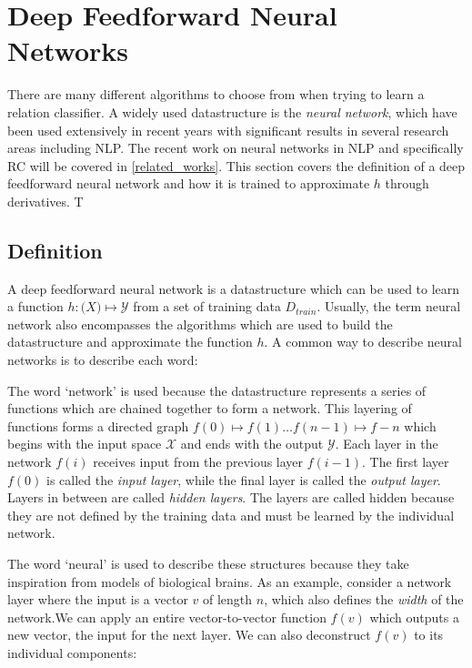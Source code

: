 \section{Deep Feedforward Neural Networks}

There are many different algorithms to choose from when trying to learn a relation classifier. A widely used datastructure is the \emph{neural network}, which have been used extensively in recent years with significant results in several research areas including NLP. The recent work on neural networks in NLP and specifically RC will be covered in \autoref{related_works}. This section covers the definition of a deep feedforward neural network and how it is trained to approximate $h$ through derivatives. T

\subsection{Definition}

A deep feedforward neural network is a datastructure which can be used to learn a function $h : \mathcal(X) \mapsto \mathcal{Y}$ from a set of training data $D_{train}$. Usually, the term neural network also encompasses the algorithms which are used to build the datastructure and approximate the function $h$. A common way to describe neural networks is to describe each word:

The word `network' is used because the datastructure represents a series of functions which are chained together to form a network. This layering of functions forms a directed graph $f(0) \mapsto f(1) \ldots f(n-1) \mapsto {f-n}$ which begins with the input space $\mathcal{X}$ and ends with the output $\mathcal{Y}$.  
Each layer in the network $f(i)$ receives input from the previous layer $f(i-1)$. The first layer $f(0)$ is called the \emph{input layer}, while the final layer is called the \emph{output layer}. Layers in between are called \emph{hidden layers}. The layers are called hidden because they are not defined by the training data and must be learned by the individual network\citep[chapter 6]{dl_book}. 

The word `neural' is used to describe these structures because they take inspiration from models of biological brains. As an example, consider a network layer where the input is a vector $v$ of length $n$, which also defines the \emph{width} of the network.We can apply an entire vector-to-vector function $f(v)$ which outputs a new vector, the input for the next layer. We can also deconstruct $f(v)$ to its individual components:

